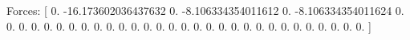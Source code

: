 Forces:
[  0.                -16.173602036437632   0.
  -8.106334354011612   0.                 -8.106334354011624
   0.                  0.                  0.
   0.                  0.                  0.
   0.                  0.                  0.
   0.                  0.                  0.
   0.                  0.                  0.
   0.                  0.                  0.
   0.                  0.                  0.
   0.                  0.                  0.
   0.                  0.                  0.
   0.                  0.                  0.               ]

